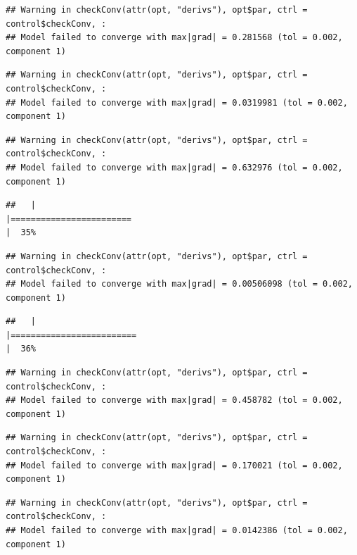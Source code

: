 \documentclass[
  12pt,
]{book}
\begin{document}
\begin{verbatim}
## Warning in checkConv(attr(opt, "derivs"), opt$par, ctrl = control$checkConv, :
## Model failed to converge with max|grad| = 0.281568 (tol = 0.002, component 1)
\end{verbatim}

\begin{verbatim}
## Warning in checkConv(attr(opt, "derivs"), opt$par, ctrl = control$checkConv, :
## Model failed to converge with max|grad| = 0.0319981 (tol = 0.002, component 1)
\end{verbatim}

\begin{verbatim}
## Warning in checkConv(attr(opt, "derivs"), opt$par, ctrl = control$checkConv, :
## Model failed to converge with max|grad| = 0.632976 (tol = 0.002, component 1)
\end{verbatim}

\begin{verbatim}
##   |                                                                              |========================                                              |  35%
\end{verbatim}

\begin{verbatim}
## Warning in checkConv(attr(opt, "derivs"), opt$par, ctrl = control$checkConv, :
## Model failed to converge with max|grad| = 0.00506098 (tol = 0.002, component 1)
\end{verbatim}

\begin{verbatim}
##   |                                                                              |=========================                                             |  36%
\end{verbatim}

\begin{verbatim}
## Warning in checkConv(attr(opt, "derivs"), opt$par, ctrl = control$checkConv, :
## Model failed to converge with max|grad| = 0.458782 (tol = 0.002, component 1)
\end{verbatim}

\begin{verbatim}
## Warning in checkConv(attr(opt, "derivs"), opt$par, ctrl = control$checkConv, :
## Model failed to converge with max|grad| = 0.170021 (tol = 0.002, component 1)
\end{verbatim}

\begin{verbatim}
## Warning in checkConv(attr(opt, "derivs"), opt$par, ctrl = control$checkConv, :
## Model failed to converge with max|grad| = 0.0142386 (tol = 0.002, component 1)
\end{verbatim}
\end{document}
